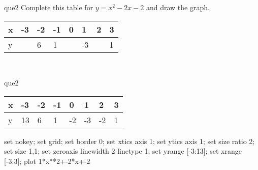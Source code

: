 \documentclass[13.5pt, varwidth=true]{beamer}
\begin{document}
\begin{frame}[shrink=19,fragile]
	\begin{beamercolorbox}[rounded=true, left, shadow=true,wd=14.8cm]{que2}
		 Complete this table for $y = x^{2} - 2x - 2$ and draw the graph. \\[0.3cm] \renewcommand{\arraystretch}{1.2}\begin{tabular}{|C|C|C|C|C|C|C|C|} \hline x & -3 & -2 & -1 & 0 & 1 & 2 & 3 \\ \hline y &  & 6 & 1 &  & -3 &  & 1\\ \hline \end{tabular}\\[0.3cm]
	\end{beamercolorbox}
\end{frame}
\begin{frame}[shrink=19,fragile]
	\begin{beamercolorbox}[rounded=true, left, shadow=true,wd=14.8cm]{que2}
		\renewcommand{\arraystretch}{1.2}\begin{tabular}{|C|C|C|C|C|C|C|C|} \hline x & -3 & -2 & -1 & 0 & 1 & 2 & 3 \\ \hline y & 13 & 6 & 1 & -2 & -3 & -2 & 1\\ \hline \end{tabular}\begin{gnuplot}[terminal=pdf] set nokey; set grid; set border 0; set xtics axis 1; set ytics axis 1; set size ratio 2; set size 1,1; set zeroaxis linewidth 2 linetype 1; set yrange [-3:13]; set xrange [-3:3]; plot 1*x**2+-2*x+-2 \end{gnuplot}
	\end{beamercolorbox}
\end{frame}
\end{document}
